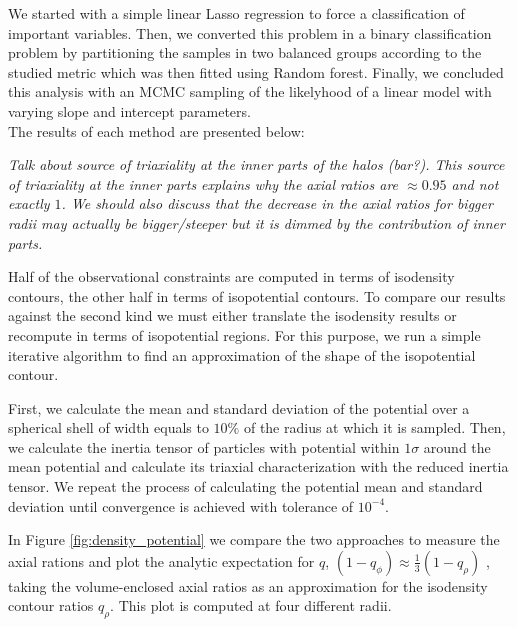 \documentclass[a4paper,fleqn,usenatbib]{mnras}
\begin{document}
  We started with a simple linear Lasso regression to force a classification of 
  important variables. Then, we converted this problem in a binary classification problem
  by partitioning the samples in two balanced groups according to the studied metric which was then fitted using Random forest.
  Finally, we concluded this analysis with an MCMC sampling of the likelyhood of a linear model
  with varying slope and intercept parameters.\\
  
  The results of each method are presented below:


\textit{ Talk about source of triaxiality at the inner parts of the
  halos (bar?). This source of triaxiality at the inner parts explains
  why the axial ratios are $\approx 0.95$ and not exactly $1$. We
  should also discuss that the decrease in the axial ratios for bigger
  radii may actually be bigger/steeper but it is dimmed by the
  contribution of inner parts.} 






Half of the observational constraints are computed in terms of
isodensity contours, the other half in terms of isopotential contours.
To compare our results against the second kind we must either
translate the isodensity results or recompute in terms of isopotential
regions.
For this purpose, we run a simple iterative algorithm to find an
approximation of the shape of the isopotential contour. 

First, we calculate the mean and standard deviation of the potential over a
spherical shell of width equals to $10\%$ of the radius at which it is
sampled. 
Then, we calculate the inertia tensor of particles with potential
within $1\sigma$ around the mean potential and calculate its triaxial
characterization with the reduced inertia tensor. 
We repeat the
process of calculating the potential mean and standard deviation until
convergence is achieved with tolerance of $10^{-4}$. 

In Figure \ref{fig:density_potential} we compare the two approaches to
measure the axial rations and plot the analytic expectation for $q$, 
$(1-q_{\phi})\approx \frac{1}{3}(1-q_{\rho})$
\citep{Binney_and_Tremaine_2008}, taking the volume-enclosed axial
ratios  as an approximation for the isodensity contour ratios
$q_{\rho}$. 
This plot is computed at four different radii.
\end{document}
